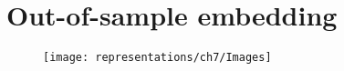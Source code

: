\section{Out-of-sample embedding}
\label{sec:ch7:oos}

\begin{figure}[h]
    \centering
    \texttt{[image: representations/ch7/Images]}
    \caption{}
    \label{fig:ch7:comm_detect:ex}
\end{figure}


\begin{lstlisting}[style=python]

\end{lstlisting}

\begin{lstlisting}[style=python]

\end{lstlisting}

\begin{lstlisting}[style=python]

\end{lstlisting}

\begin{lstlisting}[style=python]

\end{lstlisting}


\newpage